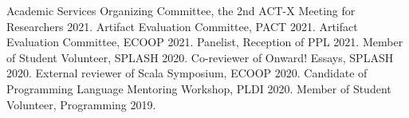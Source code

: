 \begin{rubric}{Academic Services}
  \entry*[2021] Organizing Committee, the 2nd ACT-X Meeting for Researchers 2021.
  \entry*[2021] Artifact Evaluation Committee, PACT 2021.
  \entry*[2021] Artifact Evaluation Committee, ECOOP 2021.
  \entry*[2021] Panelist, Reception of PPL 2021.
  \entry*[2020] Member of Student Volunteer, SPLASH 2020.
  \entry*[2020] Co-reviewer of Onward! Essays, SPLASH 2020.
  \entry*[2020] External reviewer of Scala Symposium, ECOOP 2020.
  \entry*[2020] Candidate of Programming Language Mentoring Workshop, PLDI 2020.
  \entry*[2019] Member of Student Volunteer, Programming 2019.
\end{rubric}
